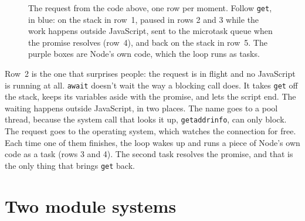 \begin{figure}[htbp]
\caption{The request from the code above, one row per moment. Follow
\texttt{get}, in blue: on the stack in row~1, paused in rows 2 and 3 while the
work happens outside JavaScript, sent to the microtask queue when the promise
resolves (row~4), and back on the stack in row~5. The purple boxes are Node's
own code, which the loop runs as tasks.}
\label{fig:request-frames}
\end{figure}

Row~2 is the one that surprises people: the request is in flight and no
JavaScript is running at all. \texttt{await} doesn't wait the way a blocking
call does. It takes \texttt{get} off the stack, keeps its variables aside with
the promise, and lets the script end. The waiting happens outside JavaScript,
in two places. The name goes to a pool thread, because the system call that
looks it up, \texttt{getaddrinfo}, can only block. The request goes to the
operating system, which watches the connection for free. Each time one of them
finishes, the loop wakes up and runs a piece of Node's own code as a task (rows
3 and 4). The second task resolves the promise, and that is the only thing that
brings \texttt{get} back.


\section{Two module systems}
\label{sec:modules}

